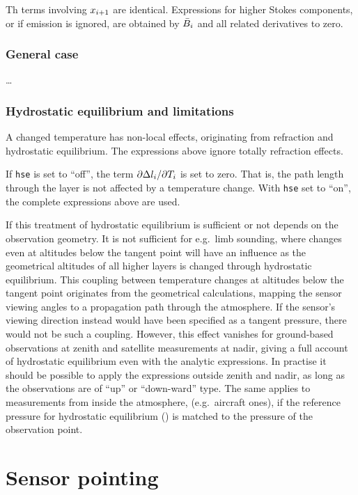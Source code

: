 Th terms involving $x_{i+1}$ are identical. Expressions for higher Stokes
components, or if emission is ignored, are obtained by $\bar{B}_i$ and
all related derivatives to zero.


\subsubsection{General case}
%
\dots



\subsubsection{Hydrostatic equilibrium and limitations}
%
A changed temperature has non-local effects, originating from refraction and
hydrostatic equilibrium. The expressions above ignore totally refraction
effects. 

If \verb|hse| is set to ``off'', the term $\partial \Delta l_{i}/\partial
T_{i}$ is set to zero. That is, the path length through the layer is not
affected by a temperature change. With \verb|hse| set to ``on'', the complete
expressions above are used.

If this treatment of hydrostatic equilibrium is sufficient or not depends on
the observation geometry. It is not sufficient for e.g.\ limb sounding, where
changes even at altitudes below the tangent point will have an influence as the
geometrical altitudes of all higher layers is changed through hydrostatic
equilibrium. This coupling between temperature changes at altitudes below the
tangent point originates from the geometrical calculations, mapping the sensor
viewing angles to a propagation path through the atmosphere. If the sensor's
viewing direction instead would have been specified as a tangent pressure, there
would not be such a coupling. However, this effect vanishes for ground-based
observations at zenith and satellite measurements at nadir, giving a full
account of hydrostatic equilibrium even with the analytic expressions. In
practise it should be possible to apply the expressions outside zenith and
nadir, as long as the observations are of ``up'' or ``down-ward'' type. The
same applies to measurements from inside the atmosphere, (e.g.\ aircraft ones),
if the reference pressure for hydrostatic equilibrium ()
is matched to the pressure of the observation point.





\section{Sensor pointing}
\label{sec:wfuns:sensorpointing}

